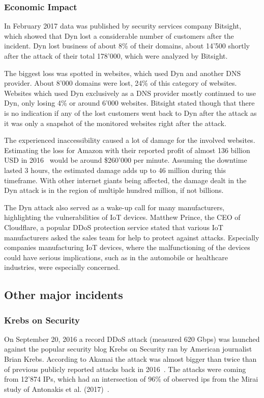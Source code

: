 \subsubsection{Economic Impact}
In February 2017 data was published by security services company Bitsight, which showed that Dyn lost a considerable number of customers after the incident.
Dyn lost business of about 8\% of their domains, about 14'500 shortly after the attack of their total 178'000, which were analyzed by Bitsight.\cite{Varghese17}

The biggest loss was spotted in websites, which used Dyn and another DNS provider.
About 8'000 domains were lost, 24\% of this category of websites.
Websites which used Dyn exclusively as a DNS provider mostly continued to use Dyn, only losing 4\% or around 6'000 websites.
Bitsight stated though that there is no indication if any of the lost customers went back to Dyn after the attack as it was only a snapshot of the monitored websites right after the attack.\cite{Varghese17}

The experienced inaccessibility caused a lot of damage for the involved websites.
Estimating the loss for Amazon with their reported profit of almost 136 billion USD in 2016~\cite{Macrotrends} would be around \$260'000 per minute.
Assuming the downtime lasted 3 hours, the estimated damage adds up to 46 million during this timeframe.
With other internet giants being affected, the damage dealt in the Dyn attack is in the region of multiple hundred million, if not billions.

The Dyn attack also served as a wake-up call for many manufacturers, highlighting the vulnerabilities of IoT devices.
Matthew Prince, the CEO of Cloudflare, a popular DDoS protection service stated that various IoT manufacturers asked the sales team for help to protect against attacks.
Especially companies manufacturing IoT devices, where the malfunctioning of the devices could have serious implications, such as in the automobile or healthcare industries, were especially concerned.\cite{Melendez17}

\subsection{Other major incidents}
\subsubsection{Krebs on Security}
On September 20, 2016 a record DDoS attack (measured 620 Gbps) was launched against the popular security blog Krebs on Security ran by American journalist Brian Krebs.
According to Akamai the attack was almost bigger than twice than of previous publicly reported attacks back in 2016~\cite{Akamai16}.
The attacks were coming from 12'874 IPs, which had an intersection of 96\% of observed ips from the Mirai study of Antonakis et al. (2017)~\cite{Antonakakis17}.

